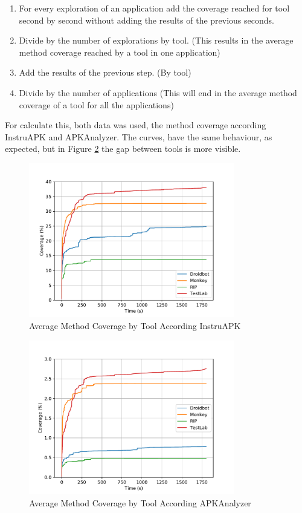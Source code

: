 \begin{enumerate}
\item For every exploration of an application add the coverage reached for tool second by second without adding the results of the previous seconds.
\item Divide by the number of explorations by tool. (This results in the average method coverage reached by a tool in one application)
\item Add the results of the previous step. (By tool)
\item Divide by the number of applications (This will end in the average method coverage of a tool for all the applications)
\end{enumerate} 

For calculate this, both data was used, the method coverage according InstruAPK and APKAnalyzer. The curves, have the same behaviour, as expected, but in Figure \ref{fig:averageCoverageAPKAnalyzer} the gap between tools is more visible.

\begin{figure}[h]
\centering
\includegraphics[width=0.8\textwidth]{../Figures/averageCoverageInstruAPK.pdf}
\caption{Average Method Coverage by Tool According InstruAPK}\label{fig:averageCoverageInstruAPK}
\end{figure}

\begin{figure}[h]
\centering
\includegraphics[width=0.8\textwidth]{../Figures/averageCoverageAPKAnalyzer.pdf}
\caption{Average Method Coverage by Tool According APKAnalyzer}\label{fig:averageCoverageAPKAnalyzer}
\end{figure}

